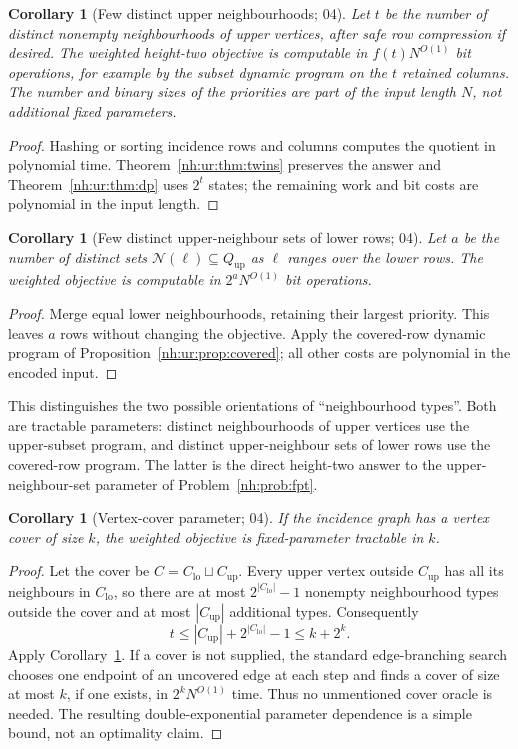 \documentclass[11pt,a4paper]{article}
\newtheorem{corollary}[theorem]{Corollary}
\theoremstyle{definition}
\theoremstyle{remark}
\newcommand{\Qup}{Q_{\mathrm{up}}}
\newcommand{\Nb}{\mathcal N}
\begin{document}
\begin{corollary}[Few distinct upper neighbourhoods; 04]\label{nh:ur:cor:types}
Let $t$ be the number of distinct nonempty neighbourhoods of upper vertices,
after safe row compression if desired. The weighted height-two objective is
computable in $f(t)N^{O(1)}$ bit operations, for example by the subset
dynamic program on the $t$ retained columns. The number and binary sizes of
the priorities are part of the input length $N$, not additional fixed
parameters.
\end{corollary}
\begin{proof}
Hashing or sorting incidence rows and columns computes the quotient in
polynomial time. Theorem~\ref{nh:ur:thm:twins} preserves the answer and
Theorem~\ref{nh:ur:thm:dp} uses $2^t$ states; the remaining work and bit costs
are polynomial in the input length.
\end{proof}

\begin{corollary}[Few distinct upper-neighbour sets of lower rows; 04]\label{nh:ur:cor:rowtypes}
Let $a$ be the number of distinct sets $\Nb(\ell)\subseteq\Qup$ as $\ell$
ranges over the lower rows. The weighted objective is computable in
$2^aN^{O(1)}$ bit operations.
\end{corollary}
\begin{proof}
Merge equal lower neighbourhoods, retaining their largest priority. This
leaves $a$ rows without changing the objective. Apply the covered-row dynamic
program of Proposition~\ref{nh:ur:prop:covered}; all other costs are
polynomial in the encoded input.
\end{proof}
This distinguishes the two possible orientations of ``neighbourhood types''.
Both are tractable parameters: distinct neighbourhoods of upper vertices use
the upper-subset program, and distinct upper-neighbour sets of lower rows use
the covered-row program. The latter is the direct height-two answer to the
upper-neighbour-set parameter of Problem~\ref{nh:prob:fpt}.

\begin{corollary}[Vertex-cover parameter; 04]\label{nh:ur:cor:vc}
If the incidence graph has a vertex cover of size $k$, the weighted objective
is fixed-parameter tractable in $k$.
\end{corollary}
\begin{proof}
Let the cover be $C=C_{\mathrm{lo}}\sqcup C_{\mathrm{up}}$. Every upper vertex
outside $C_{\mathrm{up}}$ has all its neighbours in $C_{\mathrm{lo}}$, so there
are at most $2^{|C_{\mathrm{lo}}|}-1$ nonempty neighbourhood types outside the
cover and at most $|C_{\mathrm{up}}|$ additional types. Consequently
\[
 t\le |C_{\mathrm{up}}|+2^{|C_{\mathrm{lo}}|}-1\le k+2^k.
\]
Apply Corollary~\ref{nh:ur:cor:types}. If a cover is not supplied, the
standard edge-branching search chooses one endpoint of an uncovered edge at
each step and finds a cover of size at most $k$, if one exists, in
$2^kN^{O(1)}$ time. Thus no unmentioned cover oracle is needed. The resulting
double-exponential parameter dependence is a simple bound, not an optimality
claim.
\end{proof}
\end{document}
